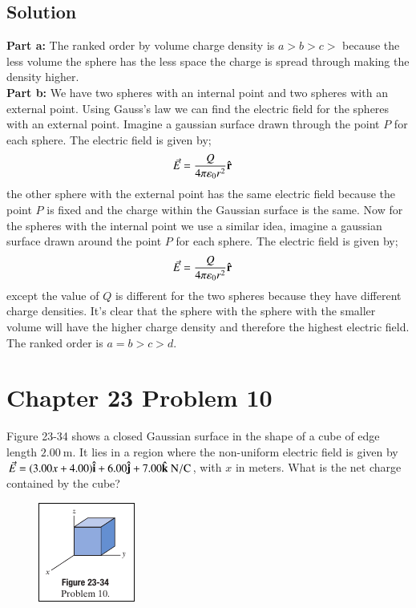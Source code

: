 \documentclass{article}
\newcommand{\m}{\text{m}}
\newcommand{\N}{\text{N}}
\newcommand{\C}{\text{C}}
\begin{document}
\subsection*{Solution}
\textbf{Part a:} The ranked order by volume charge density is $a > b > c >$ because the less volume the sphere has the less space the charge is spread through making the density higher.\vspace{12pt}\\
\textbf{Part b:} We have two spheres with an internal point and two spheres with an external point. Using Gauss's law we can find the electric field for the spheres with an external point. Imagine a gaussian surface drawn through the point $P$ for each sphere. The electric field is given by;
\begin{align*}
    \vec{E} &= \frac{Q}{4\pi \varepsilon_0 r^2} \vu r
\end{align*}
the other sphere with the external point has the same electric field because the point $P$ is fixed and the charge within the Gaussian surface is the same. Now for the spheres with the internal point we use a similar idea, imagine a gaussian surface drawn around the point $P$ for each sphere. The electric field is given by;
\begin{align*}
    \vec{E} &= \frac{Q}{4\pi \varepsilon_0 r^2} \vu r
\end{align*}
except the value of $Q$ is different for the two spheres because they have different charge densities. It's clear that the sphere with the sphere with the smaller volume will have the higher charge density and therefore the highest electric field. The ranked order is $a = b > c > d$.

\section*{Chapter 23 Problem 10}
Figure 23-34 shows a closed Gaussian surface in the shape of a cube of edge length $2.00\ \m$. It lies in a region where the non-uniform electric field is given by $\vec E = (3.00x + 4.00)\vu i + 6.00\vu j + 7.00\vu k\ \N/\C$, with $x$ in meters. What is the net charge contained by the cube?

\begin{figure}[ht]
    \centering
    \includegraphics[scale=0.75]{image-3.png}
\end{figure}
\end{document}
